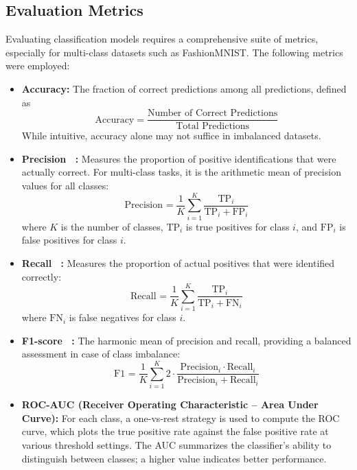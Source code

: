 \documentclass[a4paper, journal]{IEEEtran}
\begin{document}
\subsection{Evaluation Metrics}
Evaluating classification models requires a comprehensive suite of metrics, especially for multi-class datasets such as FashionMNIST. The following metrics were employed:

\begin{itemize}
    \item \textbf{Accuracy:} The fraction of correct predictions among all predictions, defined as
          \[
              \text{Accuracy} = \frac{\text{Number of Correct Predictions}}{\text{Total Predictions}}
          \]
          While intuitive, accuracy alone may not suffice in imbalanced datasets.

    \item \textbf{Precision ~:} Measures the proportion of positive identifications that were actually correct. For multi-class tasks, it is the arithmetic mean of precision values for all classes:
          \[
              \text{Precision}_\text{} = \frac{1}{K} \sum_{i=1}^{K} \frac{\text{TP}_i}{\text{TP}_i + \text{FP}_i}
          \]
          where $K$ is the number of classes, $\text{TP}_i$ is true positives for class $i$, and $\text{FP}_i$ is false positives for class $i$.

    \item \textbf{Recall ~:} Measures the proportion of actual positives that were identified correctly:
          \[
              \text{Recall}_\text{} = \frac{1}{K} \sum_{i=1}^{K} \frac{\text{TP}_i}{\text{TP}_i + \text{FN}_i}
          \]
          where $\text{FN}_i$ is false negatives for class $i$.

    \item \textbf{F1-score ~:} The harmonic mean of precision and recall, providing a balanced assessment in case of class imbalance:
          \[
              \text{F1}_\text{} = \frac{1}{K} \sum_{i=1}^{K} 2 \cdot \frac{\text{Precision}_i \cdot \text{Recall}_i}{\text{Precision}_i + \text{Recall}_i}
          \]

    \item \textbf{ROC-AUC (Receiver Operating Characteristic – Area Under Curve):} For each class, a one-vs-rest strategy is used to compute the ROC curve, which plots the true positive rate against the false positive rate at various threshold settings. The AUC summarizes the classifier's ability to distinguish between classes; a higher value indicates better performance.
\end{itemize}
\end{document}
